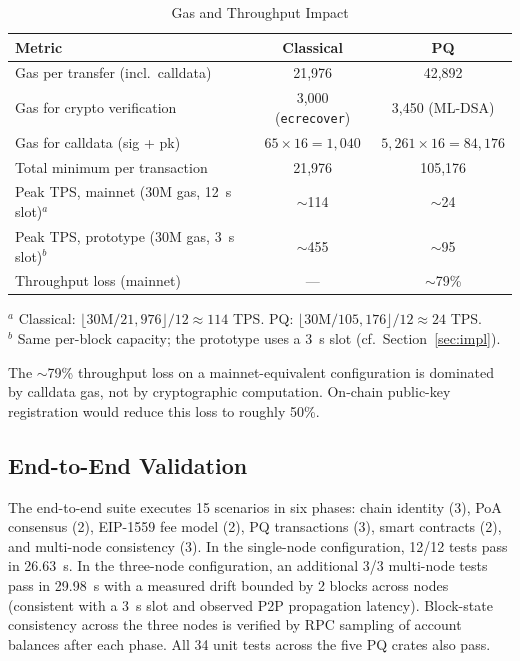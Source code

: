 \documentclass[journal,onecolumn,11pt]{IEEEtran}
\begin{document}
\begin{table}[!t]
\caption{Gas and Throughput Impact}
\label{tab:gas_impact}
\centering
\begin{tabular}{@{}lcc@{}}
\toprule
\textbf{Metric} & \textbf{Classical} & \textbf{PQ} \\
\midrule
Gas per transfer (incl.\ calldata)         & 21{,}976 & 42{,}892 \\
Gas for crypto verification                & 3{,}000 (\texttt{ecrecover}) & 3{,}450 (ML-DSA) \\
Gas for calldata (sig + pk)                & $65 \times 16 = 1{,}040$ & $5{,}261 \times 16 = 84{,}176$ \\
Total minimum per transaction              & 21{,}976 & 105{,}176 \\
Peak TPS, mainnet (30M gas, 12~s slot)$^a$ & $\sim$114 & $\sim$24 \\
Peak TPS, prototype (30M gas, 3~s slot)$^b$ & $\sim$455 & $\sim$95 \\
Throughput loss (mainnet)                  & --- & $\sim$79\% \\
\bottomrule
\end{tabular}

\vspace{2pt}
\footnotesize $^a$ Classical: $\lfloor 30\text{M}/21{,}976\rfloor / 12 \approx 114$ TPS. PQ: $\lfloor 30\text{M}/105{,}176\rfloor / 12 \approx 24$ TPS. \\
$^b$ Same per-block capacity; the prototype uses a 3~s slot (cf.\ Section~\ref{sec:impl}).
\end{table}

The $\sim$79\% throughput loss on a mainnet-equivalent configuration is dominated by calldata gas, not by cryptographic computation. On-chain public-key registration would reduce this loss to roughly 50\%.

\subsection{End-to-End Validation}

The end-to-end suite executes 15 scenarios in six phases: chain identity (3), PoA consensus (2), EIP-1559 fee model (2), PQ transactions (3), smart contracts (2), and multi-node consistency (3). In the single-node configuration, 12/12 tests pass in 26.63~s. In the three-node configuration, an additional 3/3 multi-node tests pass in 29.98~s with a measured drift bounded by 2 blocks across nodes (consistent with a 3~s slot and observed P2P propagation latency). Block-state consistency across the three nodes is verified by RPC sampling of account balances after each phase. All 34 unit tests across the five PQ crates also pass.
\end{document}
